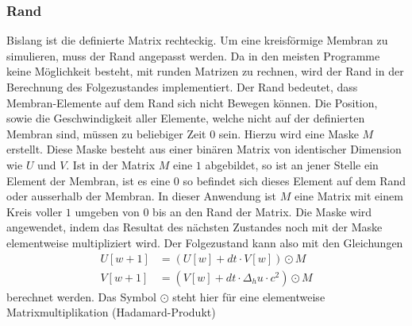 \subsubsection{Rand}
Bislang ist die definierte Matrix rechteckig.
Um eine kreisförmige Membran zu simulieren, muss der Rand angepasst werden.
Da in den meisten Programme keine Möglichkeit besteht, mit runden Matrizen zu rechnen, wird der Rand in der Berechnung des Folgezustandes implementiert.
Der Rand bedeutet, dass Membran-Elemente auf dem Rand sich nicht Bewegen können.
Die Position, sowie die Geschwindigkeit aller Elemente, welche nicht auf der definierten Membran sind, müssen zu beliebiger Zeit $0$ sein.
Hierzu wird eine Maske $M$ erstellt. 
Diese Maske besteht aus einer binären Matrix von identischer Dimension wie $ U $ und $ V $. 
Ist in der Matrix $M$ eine $1$ abgebildet, so ist an jener Stelle ein Element der Membran, ist es eine $0$ so befindet sich dieses Element auf dem Rand oder ausserhalb der Membran.
In dieser Anwendung ist $M$ eine Matrix mit einem Kreis voller $1$ umgeben von $0$ bis an den Rand der Matrix.
Die Maske wird angewendet, indem das Resultat des nächsten Zustandes noch mit der Maske elementweise multipliziert wird. 
Der Folgezustand kann also mit den Gleichungen
\begin{align}
	\label{kreismembran:eq:folge_U} 
	U[w+1] &= (U[w] + dt \cdot V[w])\odot M\\
	\label{kreismembran:eq:folge_V}
	V[w+1] &= (V[w] + dt \cdot \Delta_h u \cdot c^2)\odot M
\end{align}
berechnet werden. Das Symbol $\odot$ steht hier für eine elementweise Matrixmultiplikation (Hadamard-Produkt)
